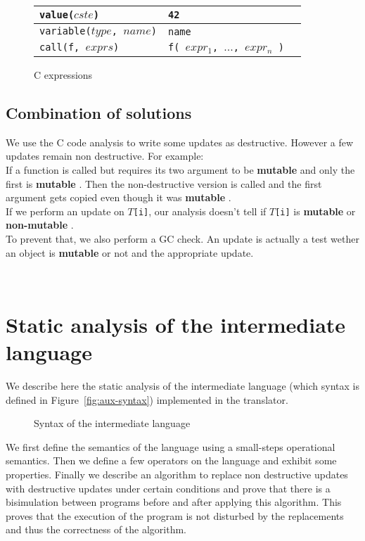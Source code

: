 \documentclass[12pt,a4paper]{article}
\newcommand{\cl}[1]{\texttt{#1}}
\newcommand{\mut}{  \textbf{ mutable } }
\newcommand{\nmut}{ \textbf{ non-mutable } }
\begin{document}
\begin{figure}[!ht]
\begin{tabular}{|p{50mm}|p{50mm}|p{50mm}|}
\hline
\cl{value($cste$)} & \cl{42} & \\ \hline
\cl{variable($type$, $name$)} & \cl{name} & \\ \hline
\cl{call(f, $exprs$)} & \cl{f( $expr_1$, $...$, $expr_n$ )} & \\ \hline
\end{tabular}
\caption{C expressions}
\end{figure}




\subsection{Combination of solutions}

We use the C code analysis to write some updates as destructive. However a few updates remain non destructive. For example:\\

If a function is called but requires its two argument to be \mut  and only the first is \mut. Then the non-destructive version is called and the first argument gets copied even though it was \mut.\\

If we perform an update on \cl{$T$[i]}, our analysis doesn't tell if \cl{$T$[i]} is \mut or \nmut.\\

To prevent that, we also perform a GC check. An update is actually a test wether an object is \mut or not and the appropriate update.






\newpage
\
\newpage

\section{Static analysis of the intermediate language}
\label{staticanal}

We describe here the static analysis of the intermediate language (which syntax is defined in Figure~\ref{fig:aux-syntax}) implemented in the translator.

\begin{figure}[!ht]

\caption{Syntax of the intermediate language}
\end{figure}

We first define the semantics of the language using a small-steps operational semantics. Then we define a few operators on the language and exhibit some properties.
Finally we describe an algorithm to replace non destructive updates with destructive updates under certain conditions and prove that there is a bisimulation between programs before and after applying this algorithm. This proves that the execution of the program is not disturbed by the replacements and thus the correctness of the algorithm.
\end{document}
